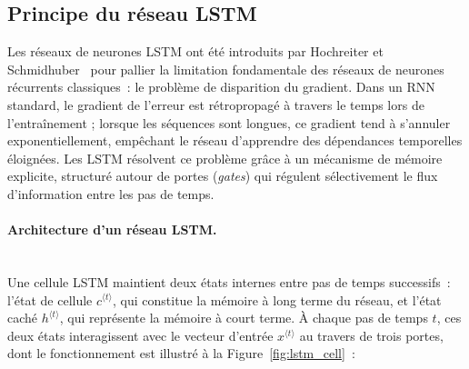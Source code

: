 \subsection{Principe du réseau LSTM}

Les réseaux de neurones LSTM ont été introduits par Hochreiter et Schmidhuber~\cite{hochreiter_long_1997} pour pallier la limitation fondamentale des réseaux de neurones récurrents classiques~: le problème de disparition du gradient. Dans un RNN standard, le gradient de l'erreur est rétropropagé à travers le temps lors de l'entraînement ; lorsque les séquences sont longues, ce gradient tend à s'annuler exponentiellement, empêchant le réseau d'apprendre des dépendances temporelles éloignées. Les LSTM résolvent ce problème grâce à un mécanisme de mémoire explicite, structuré autour de portes (\textit{gates}) qui régulent sélectivement le flux d'information entre les pas de temps.

\paragraph{Architecture d'un réseau LSTM.}\hfill \\
Une cellule LSTM maintient deux états internes entre pas de temps successifs~: l'état de cellule $c^{\langle t \rangle}$, qui constitue la mémoire à long terme du réseau, et l'état caché $h^{\langle t \rangle}$, qui représente la mémoire à court terme. À chaque pas de temps $t$, ces deux états interagissent avec le vecteur d'entrée $x^{\langle t \rangle}$ au travers de trois portes, dont le fonctionnement est illustré à la Figure~\ref{fig:lstm_cell}~:

